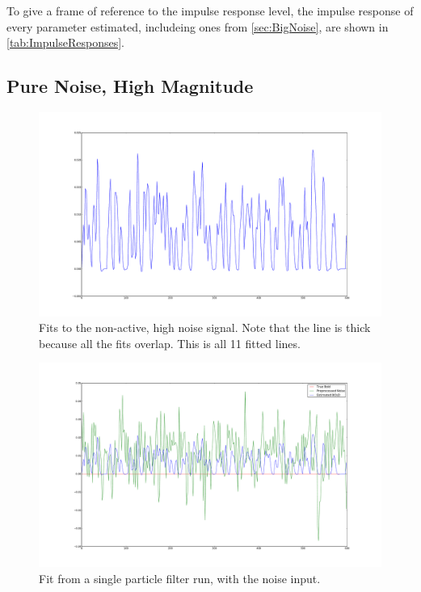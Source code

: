 To give a frame of reference to the impulse response level, the impulse response of every
parameter estimated, includeing ones from \autoref{sec:BigNoise}, are shown in \autoref{tab:ImpulseResponses}.


\subsection{Pure Noise, High Magnitude}
\label{sec:PureNoiseHighMag}

\begin{figure}[H]
\label{fig:fits_noiseonly_high}
\includegraphics[trim=6cm 3cm 6cm 3cm,width=16cm]{images/fits_noiseonly_high}
\caption{Fits to the non-active, high noise signal. Note that the line is thick because all
the fits overlap. This is all 11 fitted lines.}
\end{figure}

\begin{figure}[H]
\label{fig:justbignoise_fit_0}
\includegraphics[trim=6cm 3cm 6cm 3cm,width=16cm]{images/justbignoise_fit_0}
\caption{Fit from a single particle filter run, with the noise input. }
\end{figure} %

